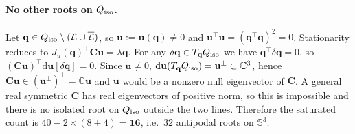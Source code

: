 \paragraph{No other roots on $Q_{\rm iso}$.} Let $\mathbf q\in Q_{\rm iso}\setminus(\mathcal L\cup\overline{\mathcal L})$, so $\mathbf u:=\mathbf u(\mathbf q)\ne0$ and $\mathbf u^\top\mathbf u=(\mathbf q^\top\mathbf q)^2=0$. Stationarity reduces to $J_u(\mathbf q)^\top\mathbf C\mathbf u=\lambda\mathbf q$. For any $\delta\mathbf q\in T_{\mathbf q}Q_{\rm iso}$ we have $\mathbf q^\top\delta\mathbf q=0$, so $(\mathbf C\mathbf u)^\top\mathrm d\mathbf u[\delta\mathbf q]=0$. Since $\mathbf u\ne0$, $\mathrm d\mathbf u(T_{\mathbf q}Q_{\rm iso})=\mathbf u^\perp\subset\mathbb C^3$, hence $\mathbf C\mathbf u\in(\mathbf u^\perp)^\perp=\mathbb C\mathbf u$ and $\mathbf u$ would be a nonzero null eigenvector of $\mathbf C$. A general real symmetric $\mathbf C$ has real eigenvectors of positive norm, so this is impossible and there is no isolated root on $Q_{\rm iso}$ outside the two lines. Therefore the saturated count is $40-2\times(8+4)=\mathbf{16}$, i.e.\ $32$ antipodal roots on $\mathbb S^3$.

